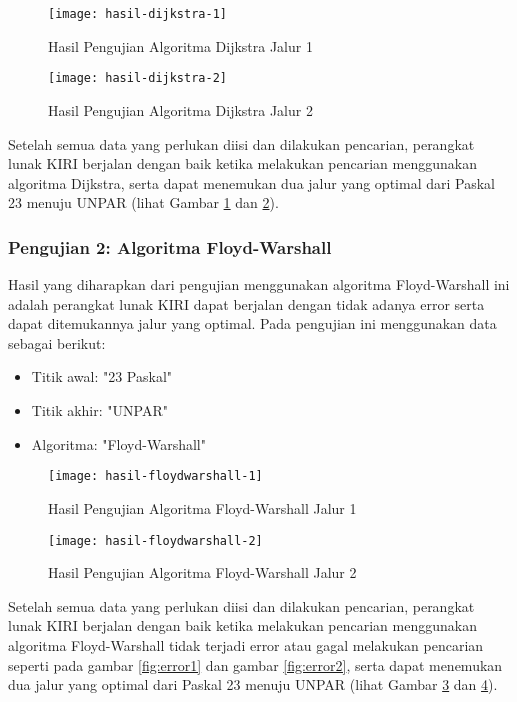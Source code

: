 \begin{figure}[H]
    \centering
    \texttt{[image: hasil-dijkstra-1]}
    \caption{Hasil Pengujian Algoritma Dijkstra Jalur 1}
    \label{fig:hasildijkstra-1}
\end{figure}

\begin{figure}[H]
    \centering
    \texttt{[image: hasil-dijkstra-2]}
    \caption{Hasil Pengujian Algoritma Dijkstra Jalur 2}
    \label{fig:hasildijkstra-2}
\end{figure}

Setelah semua data yang perlukan diisi dan dilakukan pencarian, perangkat lunak KIRI berjalan dengan baik ketika melakukan pencarian menggunakan algoritma Dijkstra, serta dapat menemukan dua jalur yang optimal dari Paskal 23 menuju UNPAR (lihat Gambar \ref{fig:hasildijkstra-1} dan \ref{fig:hasildijkstra-2}).

\subsubsection{Pengujian 2: Algoritma Floyd-Warshall}
Hasil yang diharapkan dari pengujian menggunakan algoritma Floyd-Warshall ini adalah perangkat lunak KIRI dapat berjalan dengan tidak adanya error serta dapat ditemukannya jalur yang optimal. Pada pengujian ini menggunakan data sebagai berikut:
\begin{itemize}
    \item Titik awal: "23 Paskal"
    \item Titik akhir: "UNPAR"
    \item Algoritma: "Floyd-Warshall"
\end{itemize}

\begin{figure}[H]
    \centering
    \texttt{[image: hasil-floydwarshall-1]}
    \caption{Hasil Pengujian Algoritma Floyd-Warshall Jalur 1}
    \label{fig:hasilfloydwarshall-1}
\end{figure}

\begin{figure}[H]
    \centering
    \texttt{[image: hasil-floydwarshall-2]}
    \caption{Hasil Pengujian Algoritma Floyd-Warshall Jalur 2}
    \label{fig:hasilfloydwarshall-2}
\end{figure}

Setelah semua data yang perlukan diisi dan dilakukan pencarian, perangkat lunak KIRI berjalan dengan baik ketika melakukan pencarian menggunakan algoritma Floyd-Warshall tidak terjadi error atau gagal melakukan pencarian seperti pada gambar \ref{fig:error1} dan gambar \ref{fig:error2}, serta dapat menemukan dua jalur yang optimal dari Paskal 23 menuju UNPAR (lihat Gambar \ref{fig:hasilfloydwarshall-1} dan \ref{fig:hasilfloydwarshall-2}).

